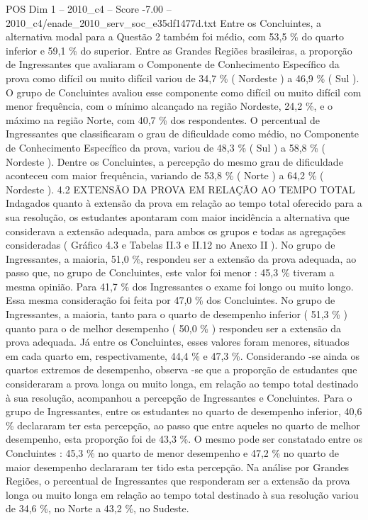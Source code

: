 \begin{textsample}{POS Dim 1 – 2010\_c4 – Score -7.00 – 2010\_c4/enade\_2010\_serv\_soc\_e35df1477d.txt}
Entre os Concluintes, a alternativa modal para a Questão 2 também foi médio, com 53,5 \% do quarto inferior e 59,1 \% do superior.
Entre as Grandes Regiões brasileiras, a proporção de Ingressantes que avaliaram o Componente de Conhecimento Específico da prova como difícil ou muito difícil variou de 34,7 \% ( Nordeste ) a 46,9 \% ( Sul ).
O grupo de Concluintes avaliou esse componente como difícil ou muito difícil com menor frequência, com o mínimo alcançado na região Nordeste, 24,2 \%, e o máximo na região Norte, com 40,7 \% dos respondentes.
O percentual de Ingressantes que classificaram o grau de dificuldade como médio, no Componente de Conhecimento Específico da prova, variou de 48,3 \% ( Sul ) a 58,8 \% ( Nordeste ).
Dentre os Concluintes, a percepção do mesmo grau de dificuldade aconteceu com maior frequência, variando de 53,8 \% ( Norte ) a 64,2 \% ( Nordeste ). 4.2 EXTENSÃO DA PROVA EM RELAÇÃO AO TEMPO TOTAL Indagados quanto à extensão da prova em relação ao tempo total oferecido para a sua resolução, os estudantes apontaram com maior incidência a alternativa que considerava a extensão adequada, para ambos os grupos e todas as agregações consideradas ( Gráfico 4.3 e Tabelas II.3 e II.12 no Anexo II ).
No grupo de Ingressantes, a maioria, 51,0 \%, respondeu ser a extensão da prova adequada, ao passo que, no grupo de Concluintes, este valor foi menor : 45,3 \% tiveram a mesma opinião.
Para 41,7 \% dos Ingressantes o exame foi longo ou muito longo.
Essa mesma consideração foi feita por 47,0 \% dos Concluintes.
No grupo de Ingressantes, a maioria, tanto para o quarto de desempenho inferior ( 51,3 \% ) quanto para o de melhor desempenho ( 50,0 \% ) respondeu ser a extensão da prova adequada.
Já entre os Concluintes, esses valores foram menores, situados em cada quarto em, respectivamente, 44,4 \% e 47,3 \%.
Considerando -se ainda os quartos extremos de desempenho, observa -se que a proporção de estudantes que consideraram a prova longa ou muito longa, em relação ao tempo total destinado à sua resolução, acompanhou a percepção de Ingressantes e Concluintes.
Para o grupo de Ingressantes, entre os estudantes no quarto de desempenho inferior, 40,6 \% declararam ter esta percepção, ao passo que entre aqueles no quarto de melhor desempenho, esta proporção foi de 43,3 \%.
O mesmo pode ser constatado entre os Concluintes : 45,3 \% no quarto de menor desempenho e 47,2 \% no quarto de maior desempenho declararam ter tido esta percepção.
Na análise por Grandes Regiões, o percentual de Ingressantes que responderam ser a extensão da prova longa ou muito longa em relação ao tempo total destinado à sua resolução variou de 34,6 \%, no Norte a 43,2 \%, no Sudeste.

\end{textsample}
